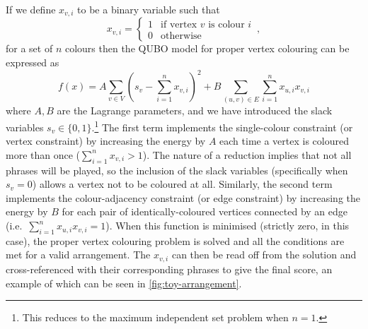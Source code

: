 \documentclass[12pt]{article}
\theoremstyle{definition}
\begin{document}
If we define $x_{v,i}$ to be a binary variable such that
\begin{equation}
    x_{v,i} =
    \begin{cases}
        1 & \text{if vertex $v$ is colour $i$} \\
        0 & \text{otherwise}
    \end{cases}
    \,,
\end{equation}
for a set of $n$ colours then the QUBO model for proper vertex colouring can be expressed as
\begin{equation}
    f(x)=A\sum_{v \in V}\left(s_v-\sum_{i=1}^{n} x_{v,i}\right)^2+B\sum_{(u,v) \in E}\sum_{i=1}^n x_{u,i}x_{v,i}
    \label{eq:colouring}
\end{equation}
where $A,B$ are the Lagrange parameters, and we have introduced the slack variables $s_v\in\{0,1\}$.\footnote{This reduces to the maximum independent set problem when $n=1$.} The first term implements the single-colour constraint (or vertex constraint) by increasing the energy by $A$ each time a vertex is coloured more than once ($\sum_{i=1}^{n} x_{v,i}>1$). The nature of a reduction implies that not all phrases will be played, so the inclusion of the slack variables (specifically when $s_v=0$) allows a vertex not to be coloured at all. Similarly, the second term implements the colour-adjacency constraint (or edge constraint) by increasing the energy by $B$ for each pair of identically-coloured vertices connected by an edge (i.e.\ $\sum_{i=1}^n x_{u,i}x_{v,i}=1$). When this function is minimised (strictly zero, in this case), the proper vertex colouring problem is solved and all the conditions are met for a valid arrangement. The $x_{v,i}$ can then be read off from the solution and cross-referenced with their corresponding phrases to give the final score, an example of which can be seen in \cref{fig:toy-arrangement}.
\end{document}
